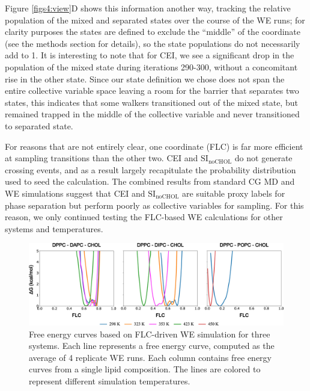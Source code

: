 \documentclass{biophys-new}
\begin{document}
Figure \ref{figs4:view}D shows this information another way, tracking the relative population of the mixed and separated states over the course of the WE runs; for clarity purposes the states are defined to exclude the ``middle'' of the coordinate (see the methods section for details), so the state populations do not necessarily add to 1.
It is interesting to note that for CEI, we see a significant drop in the population of the mixed state during iterations 290-300, without a concomitant rise in the other state.
Since our state definition we chose does not span the entire collective variable space leaving a room for the barrier that separates two states, this indicates that some walkers transitioned out of the mixed state, but remained trapped in the middle of the collective variable and never transitioned to separated state. 

For reasons that are not entirely clear, one coordinate (FLC) is far more efficient at sampling transitions than the other two. CEI and $\text{SI}_{\text{noCHOL}}$ do not generate crossing events, and as a result largely recapitulate the probability distribution used to seed the calculation.
The combined results from standard CG MD and WE simulations suggest that CEI and $\text{SI}_{\text{noCHOL}}$ are suitable proxy labels for phase separation but perform poorly as collective variables for sampling.
For this reason, we only continued testing the FLC-based WE calculations for other systems and temperatures.


\begin{figure}[hbt!]
\centering
\includegraphics[width=6.5in]{Figures/Main/5/placeholder.jpg}
\caption{Free energy curves based on FLC-driven WE simulation for three systems. Each line represents a free energy curve, computed as the average of 4 replicate WE runs. Each column contains free energy curves from a single lipid composition. The lines are colored to represent different simulation temperatures.}
\label{figs5:view}
\end{figure}
\end{document}
